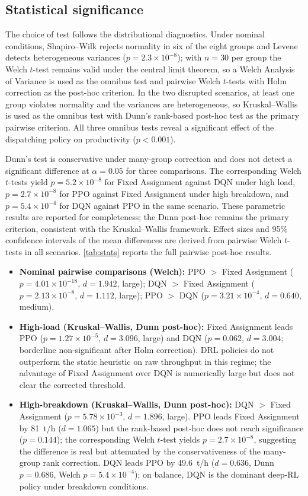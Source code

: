 \documentclass[11pt,a4paper]{article}
\begin{document}
\subsection{Statistical significance}

The choice of test follows the distributional diagnostics. Under nominal conditions, Shapiro--Wilk rejects normality in six of the eight groups and Levene detects heterogeneous variances ($p=2.3\times10^{-8}$); with $n=30$ per group the Welch $t$-test remains valid under the central limit theorem, so a Welch Analysis of Variance is used as the omnibus test and pairwise Welch $t$-tests with Holm correction as the post-hoc criterion. In the two disrupted scenarios, at least one group violates normality and the variances are heterogeneous, so Kruskal--Wallis is used as the omnibus test with Dunn's rank-based post-hoc test as the primary pairwise criterion. All three omnibus tests reveal a significant effect of the dispatching policy on productivity ($p<0.001$).

Dunn's test is conservative under many-group correction and does not detect a significant difference at $\alpha=0.05$ for three comparisons. The corresponding Welch $t$-tests yield $p=5.2\times10^{-8}$ for Fixed Assignment against DQN under high load, $p=2.7\times10^{-8}$ for PPO against Fixed Assignment under high breakdown, and $p=5.4\times10^{-4}$ for DQN against PPO in the same scenario. These parametric results are reported for completeness; the Dunn post-hoc remains the primary criterion, consistent with the Kruskal--Wallis framework. Effect sizes and 95\% confidence intervals of the mean differences are derived from pairwise Welch $t$-tests in all scenarios. \cref{tab:stats} reports the full pairwise post-hoc results.

\begin{itemize}
  \item \textbf{Nominal pairwise comparisons (Welch):} PPO $>$ Fixed Assignment ($p=4.01\times10^{-18}$, $d=1.942$, large); DQN $>$ Fixed Assignment ($p=2.13\times10^{-8}$, $d=1.112$, large); PPO $>$ DQN ($p=3.21\times10^{-4}$, $d=0.640$, medium).
  \item \textbf{High-load (Kruskal--Wallis, Dunn post-hoc):} Fixed Assignment leads PPO ($p=1.27\times10^{-5}$, $d=3.096$, large) and DQN ($p=0.062$, $d=3.004$; borderline non-significant after Holm correction). DRL policies do not outperform the static heuristic on raw throughput in this regime; the advantage of Fixed Assignment over DQN is numerically large but does not clear the corrected threshold.
  \item \textbf{High-breakdown (Kruskal--Wallis, Dunn post-hoc):} DQN $>$ Fixed Assignment ($p=5.78\times10^{-3}$, $d=1.896$, large). PPO leads Fixed Assignment by 81~t/h ($d=1.065$) but the rank-based post-hoc does not reach significance ($p=0.144$); the corresponding Welch $t$-test yields $p=2.7\times10^{-8}$, suggesting the difference is real but attenuated by the conservativeness of the many-group rank correction. DQN leads PPO by 49.6~t/h ($d=0.636$, Dunn $p=0.686$, Welch $p=5.4\times10^{-4}$); on balance, DQN is the dominant deep-RL policy under breakdown conditions.
\end{itemize}
\end{document}
